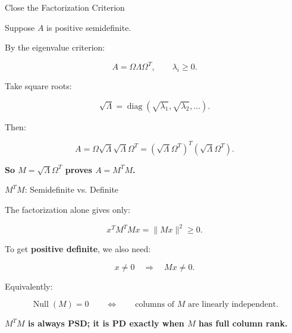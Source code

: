 \documentclass[10pt]{beamer}
\theoremstyle{definition}
\newcommand{\x}[1]{\alert{\textbf{#1}}}
\begin{document}
\begin{frame}{Close the Factorization Criterion}

Suppose $A$ is positive semidefinite.

\vfill

By the eigenvalue criterion:

$$
A=\Omega\Lambda\Omega^T,\qquad \lambda_i\ge0.
$$

\vfill

Take square roots:

$$
\sqrt{\Lambda}=\operatorname{diag}(\sqrt{\lambda_1},\sqrt{\lambda_2},\ldots).
$$

\vfill

Then:

$$
A=\Omega\sqrt{\Lambda}\sqrt{\Lambda}\Omega^T
=(\sqrt{\Lambda}\Omega^T)^T(\sqrt{\Lambda}\Omega^T).
$$

\begin{center}
\x{So $M=\sqrt{\Lambda}\Omega^T$ proves $A=M^TM$.}
\end{center}

\end{frame}


\begin{frame}[shrink=5]{$M^TM$: Semidefinite vs. Definite}

The factorization alone gives only:

$$
x^TM^TMx=\|Mx\|^2\ge0.
$$

\vfill

To get \x{positive definite}, we also need:

$$
x\ne0\quad\Longrightarrow\quad Mx\ne0.
$$

\vfill

Equivalently:

$$
\boxed{\operatorname{Null}(M)=0}
\qquad\Longleftrightarrow\qquad
\boxed{\text{columns of }M\text{ are linearly independent}.}
$$

\vfill

\begin{center}
\x{$M^TM$ is always PSD; it is PD exactly when $M$ has full column rank.}
\end{center}

\end{frame}


\end{document}
